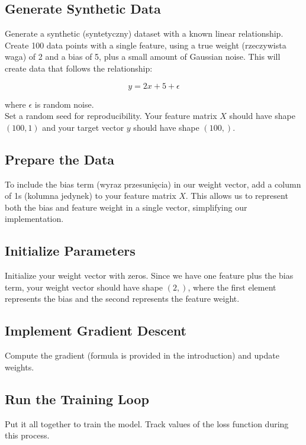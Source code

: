 \documentclass{article}
\begin{document}
\subsection{Generate Synthetic Data}

Generate a synthetic (syntetyczny) dataset with a known linear relationship. Create 100 data points with a single feature, using a true weight (rzeczywista waga) of 2 and a bias of 5, plus a small amount of Gaussian noise. This will create data that follows the relationship:

\[
y = 2x + 5 + \epsilon
\]

where \( \epsilon \) is random noise.\\
Set a random seed for reproducibility. Your feature matrix \( X \) should have shape \( (100, 1) \) and your target vector \( y \) should have shape \( (100,) \).

\subsection{ Prepare the Data}

To include the bias term (wyraz przesunięcia) in our weight vector, add a column of 1s (kolumna jedynek) to your feature matrix \( X \). This allows us to represent both the bias and feature weight in a single vector, simplifying our implementation.

\subsection{ Initialize Parameters}

Initialize your weight vector with zeros. Since we have one feature plus the bias term, your weight vector should have shape \( (2,) \), where the first element represents the bias and the second represents the feature weight.

\subsection{ Implement Gradient Descent}

Compute the gradient (formula is provided in the introduction) and update weights.

\subsection{ Run the Training Loop}

Put it all together to train the model. Track values of the loss function during this process.
\end{document}

